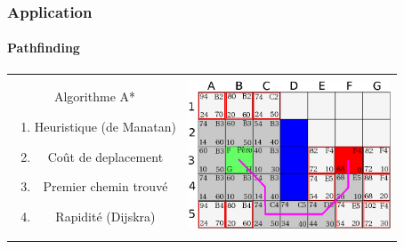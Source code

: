 	\begin{frame}
	\frametitle{Application}
	\framesubtitle{Pathfinding}
	
		\begin{tabular}{cc}
			\begin{minipage}{5cm}
				Algorithme A*
				\begin{enumerate}
					\item Heuristique (de Manatan)
					\item Coût de deplacement
					\item Premier chemin trouvé
					\item Rapidité (Dijskra)
				\end{enumerate}
			\end{minipage} &
			\begin{minipage}{5cm}
				\includegraphics[width=6cm]{img/astar.png} 
			\end{minipage}\\
		\end{tabular}
	
	\end{frame}
	
